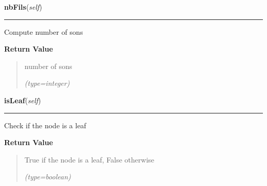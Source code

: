     \vspace{0.5ex}

\hspace{.8\funcindent}\begin{boxedminipage}{\funcwidth}

    \raggedright \textbf{nbFils}(\textit{self})

    \vspace{-1.5ex}

    \rule{\textwidth}{0.5\fboxrule}
\setlength{\parskip}{2ex}
    Compute number of sons

\setlength{\parskip}{1ex}
      \textbf{Return Value}
    \vspace{-1ex}

      \begin{quote}
      number of sons

      {\it (type=integer)}

      \end{quote}

    \end{boxedminipage}

    \label{script-phyloFixedVar:node:isLeaf}

    \vspace{0.5ex}

\hspace{.8\funcindent}\begin{boxedminipage}{\funcwidth}

    \raggedright \textbf{isLeaf}(\textit{self})

    \vspace{-1.5ex}

    \rule{\textwidth}{0.5\fboxrule}
\setlength{\parskip}{2ex}
    Check if the node is a leaf

\setlength{\parskip}{1ex}
      \textbf{Return Value}
    \vspace{-1ex}

      \begin{quote}
      True if the node is a leaf, False otherwise

      {\it (type=boolean)}

      \end{quote}

    \end{boxedminipage}

    \label{script-phyloFixedVar:node:setPere}

